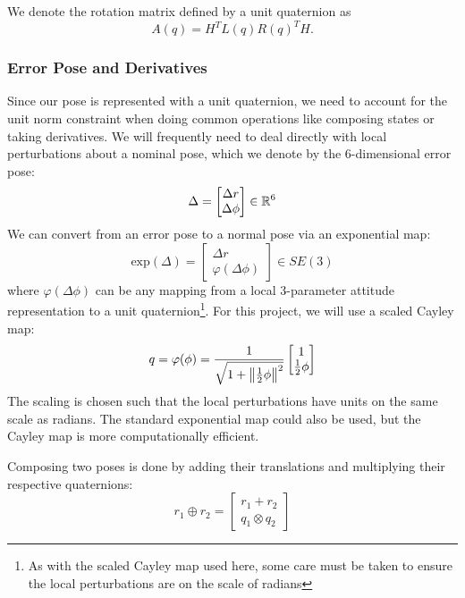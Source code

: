 \documentclass[conference]{IEEEtran}
\begin{document}
We denote the rotation matrix defined by a unit quaternion as 
\begin{equation}
    A(q) = H^T L(q) R(q)^T H.
\end{equation}

\subsubsection{Error Pose and Derivatives}
Since our pose is represented with a unit quaternion, we need to account for the unit 
norm constraint when doing common operations like composing states or taking derivatives.
We will frequently need to deal directly with local perturbations about a nominal pose, 
which we denote by the 6-dimensional error pose:
\begin{equation}
    \Delta = \begin{bmatrix}
        \Delta r \\ \Delta \phi
    \end{bmatrix} \in \mathbb{R}^6
\end{equation}
We can convert from an error pose to a normal pose via an exponential map:
\begin{equation}
    \text{exp}(\Delta) = \begin{bmatrix}
        \Delta r \\ \varphi(\Delta \phi)
    \end{bmatrix} \in SE(3)
\end{equation}
where $\varphi(\Delta \phi)$ can be any mapping from a local 3-parameter attitude 
representation to a unit quaternion\footnote{As with the scaled Cayley map used here, 
some care must be taken to ensure the local perturbations are on the scale of radians}. 
For this project, we will use a scaled Cayley map:
\begin{equation}
    q = \varphi(\phi) = \frac{1}{\sqrt{1 + \norm{\frac{1}{2} \phi}^2}} \begin{bmatrix}
        1 \\ \frac{1}{2} \phi
    \end{bmatrix}
\end{equation}
The scaling is chosen such that the local perturbations have units on the same scale as 
radians. The standard exponential map could also be used, but the Cayley map is more 
computationally efficient. 

Composing two poses is done by adding their translations and multiplying their respective 
quaternions:
\begin{equation}
    r_1 \oplus r_2 = \begin{bmatrix}
        r_1 + r_2 \\ q_1 \otimes q_2
    \end{bmatrix}
\end{equation}
\end{document}
